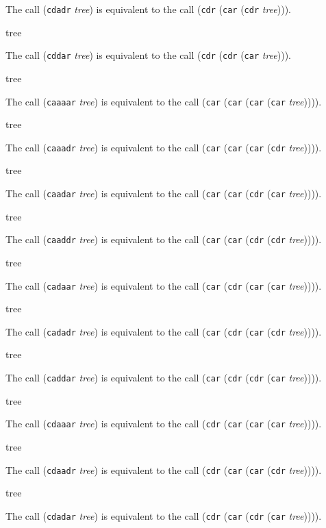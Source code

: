 The call (\texttt{cdadr} \textit{tree}) is equivalent to the call
(\texttt{cdr} (\texttt{car} (\texttt{cdr} \textit{tree}))).


 {tree}

The call (\texttt{cddar} \textit{tree}) is equivalent to the call
(\texttt{cdr} (\texttt{cdr} (\texttt{car} \textit{tree}))).

 {tree}

The call (\texttt{caaaar} \textit{tree}) is equivalent to the call
(\texttt{car} (\texttt{car} (\texttt{car} (\texttt{car}
\textit{tree})))).

 {tree}

The call (\texttt{caaadr} \textit{tree}) is equivalent to the call
(\texttt{car} (\texttt{car} (\texttt{car} (\texttt{cdr}
\textit{tree})))).

 {tree}

The call (\texttt{caadar} \textit{tree}) is equivalent to the call
(\texttt{car} (\texttt{car} (\texttt{cdr} (\texttt{car}
\textit{tree})))).

 {tree}

The call (\texttt{caaddr} \textit{tree}) is equivalent to the call
(\texttt{car} (\texttt{car} (\texttt{cdr} (\texttt{cdr}
\textit{tree})))).

 {tree}

The call (\texttt{cadaar} \textit{tree}) is equivalent to the call
(\texttt{car} (\texttt{cdr} (\texttt{car} (\texttt{car}
\textit{tree})))).

 {tree}

The call (\texttt{cadadr} \textit{tree}) is equivalent to the call
(\texttt{car} (\texttt{cdr} (\texttt{car} (\texttt{cdr}
\textit{tree})))).

 {tree}

The call (\texttt{caddar} \textit{tree}) is equivalent to the call
(\texttt{car} (\texttt{cdr} (\texttt{cdr} (\texttt{car}
\textit{tree})))).

 {tree}

The call (\texttt{cdaaar} \textit{tree}) is equivalent to the call
(\texttt{cdr} (\texttt{car} (\texttt{car} (\texttt{car}
\textit{tree})))).

 {tree}

The call (\texttt{cdaadr} \textit{tree}) is equivalent to the call
(\texttt{cdr} (\texttt{car} (\texttt{car} (\texttt{cdr}
\textit{tree})))).

 {tree}

The call (\texttt{cdadar} \textit{tree}) is equivalent to the call
(\texttt{cdr} (\texttt{car} (\texttt{cdr} (\texttt{car}
\textit{tree})))).
